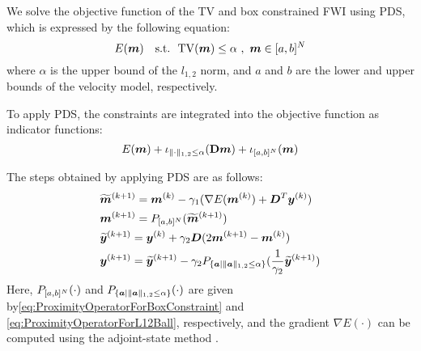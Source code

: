 We solve the objective function of the TV and box constrained FWI using PDS, which is expressed by the following equation:
\begin{equation} \label{eq:FWIObjectiveWithTVConstraint} \FWIObjectiveWithTVConstraint \end{equation}
where $\alpha$ is the upper bound of the $l_{1,2}$ norm, and $a$ and $b$ are the lower and upper bounds of the velocity model, respectively.

To apply PDS, the constraints are integrated into the objective function as indicator functions:
\begin{equation} \label{eq:FWIObjectiveWithTVConstraintWithIndicatorFunction} \FWIObjectiveWithTVConstraintWithIndicatorFunction \end{equation}

The steps obtained by applying PDS are as follows:
\begin{equation} \label{eq:FWIWithPDS} \FWIWithPDS \notag \end{equation}
Here, $\projBox{\cdot}$ and $\projLOneTwoBall{\cdot}$ are given by\eqref{eq:ProximityOperatorForBoxConstraint} and \eqref{eq:ProximityOperatorForL12Ball}, respectively, and the gradient ${\nabla E(\cdot)}$ can be computed using the adjoint-state method \cite{FWI-gradient}.

